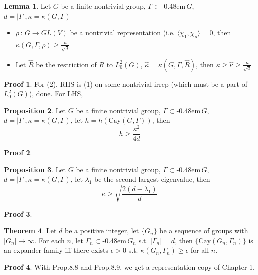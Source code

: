 \documentclass{book}
\newcommand{\syin}{$\subset$\kern-0.48em\raisebox{.20ex}{\tiny S}$\,$}
\newcommand{\inner}[1]{\langle #1 \rangle}
\newcommand{\abs}[1]{\lvert #1 \rvert }
\newcommand{\Cay}[1]{\textrm{Cay}( #1 )}
\theoremstyle{definition}
\newtheorem{lemma}{Lemma}[chapter]
\newtheorem{proposition}[lemma]{Proposition}
\newtheorem{theorem}[lemma]{Theorem}
\theoremstyle{remarkstyle}
\newtheorem*{myproof}{Proof}%
\begin{document}
\begin{lemma}
    Let $G$ be a finite nontrivial group, $\Gamma$\syin$G$, $d=\abs{\Gamma},\kappa=\kappa(G,\Gamma)$
    \begin{itemize}
        \item $\rho\,:\,G\rightarrow GL(V)$ be a nontrivial representation (i.e. $\inner{\chi_1,\chi_\rho}=0$, then $\kappa(G,\Gamma,\rho)\ge \frac{\kappa}{\sqrt{d}}$
        \item Let $\hat{R}$ be the restriction of $R$ to $L^2_0(G)$, $\hat{\kappa}=\kappa(G,\Gamma,\hat{R})$, then $\kappa\ge\hat{\kappa}\ge\frac{\kappa}{\sqrt{d}}$
    \end{itemize}
\end{lemma}
\begin{myproof}
    For (2), RHS is (1) on some nontrivial irrep (which must be a part of $L^2_0(G)$), done. For LHS, 
    \newline 
\end{myproof}

\begin{proposition}
    Let $G$ be a finite nontrivial group, $\Gamma$\syin$G$, $d=\abs{\Gamma},\kappa=\kappa(G,\Gamma)$, let $h=h(\Cay{G,\Gamma})$, then 
    $$
    h \ge \frac{\kappa^2}{4d}
    $$
\end{proposition}
\begin{myproof}

\end{myproof}

\begin{proposition}
    Let $G$ be a finite nontrivial group, $\Gamma$\syin$G$, $d=\abs{\Gamma},\kappa=\kappa(G,\Gamma)$, let $\lambda_1$ be the second largest eigenvalue, then 
    $$
    \kappa \ge \sqrt{\frac{2(d-\lambda_1)}{d}}
    $$
\end{proposition}
\begin{myproof}
    
\end{myproof}

\begin{theorem}
    Let $d$ be a positive integer, let $\{G_n\}$ be a sequence of groups with $\abs{G_n}\rightarrow\infty$. For each $n$, let $\Gamma_n$\syin $G_n$ s.t. $\abs{\Gamma_n}=d$, then $\{\Cay{G_n,\Gamma_n}\}$ is an expander family iff there exists $\epsilon>0$ s.t. $\kappa(G_n,\Gamma_n)\ge\epsilon$ for all $n$.
\end{theorem}
\begin{myproof}
    With Prop.8.8 and Prop.8.9, we get a representation copy of Chapter 1. \newline 
\end{myproof}
\end{document}
